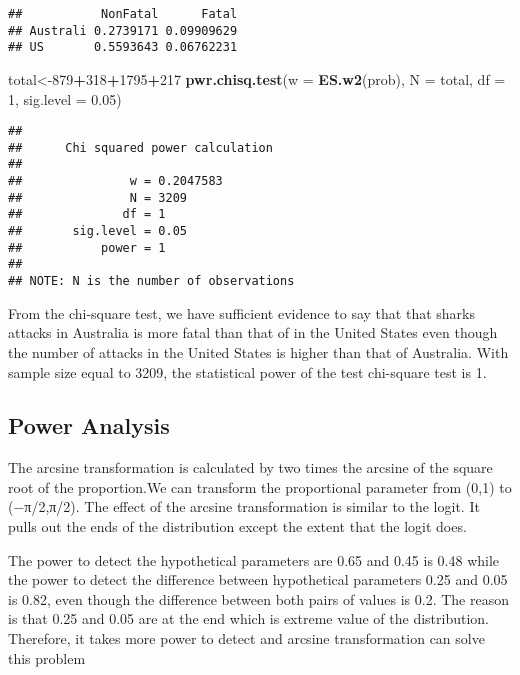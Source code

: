 \documentclass[]{article}
\newenvironment{Shaded}{\begin{snugshade}}{\end{snugshade}}
\newcommand{\KeywordTok}[1]{\textcolor[rgb]{0.13,0.29,0.53}{\textbf{#1}}}
\newcommand{\DataTypeTok}[1]{\textcolor[rgb]{0.13,0.29,0.53}{#1}}
\newcommand{\DecValTok}[1]{\textcolor[rgb]{0.00,0.00,0.81}{#1}}
\newcommand{\FloatTok}[1]{\textcolor[rgb]{0.00,0.00,0.81}{#1}}
\newcommand{\OperatorTok}[1]{\textcolor[rgb]{0.81,0.36,0.00}{\textbf{#1}}}
\newcommand{\NormalTok}[1]{#1}
\begin{document}
\begin{verbatim}
##           NonFatal      Fatal
## Australi 0.2739171 0.09909629
## US       0.5593643 0.06762231
\end{verbatim}

\begin{Shaded}
\begin{Highlighting}[]
\NormalTok{total<-}\DecValTok{879}\OperatorTok{+}\DecValTok{318}\OperatorTok{+}\DecValTok{1795}\OperatorTok{+}\DecValTok{217}
\KeywordTok{pwr.chisq.test}\NormalTok{(}\DataTypeTok{w =} \KeywordTok{ES.w2}\NormalTok{(prob), }\DataTypeTok{N =}\NormalTok{ total, }\DataTypeTok{df =} \DecValTok{1}\NormalTok{, }\DataTypeTok{sig.level =} \FloatTok{0.05}\NormalTok{)}
\end{Highlighting}
\end{Shaded}

\begin{verbatim}
## 
##      Chi squared power calculation 
## 
##               w = 0.2047583
##               N = 3209
##              df = 1
##       sig.level = 0.05
##           power = 1
## 
## NOTE: N is the number of observations
\end{verbatim}

From the chi-square test, we have sufficient evidence to say that that
sharks attacks in Australia is more fatal than that of in the United
States even though the number of attacks in the United States is higher
than that of Australia. With sample size equal to 3209, the statistical
power of the test chi-square test is 1.

\subsection{Power Analysis}\label{power-analysis}

The arcsine transformation is calculated by two times the arcsine of the
square root of the proportion.We can transform the proportional
parameter from (0,1) to (−π/2,π/2). The effect of the arcsine
transformation is similar to the logit. It pulls out the ends of the
distribution except the extent that the logit does.

The power to detect the hypothetical parameters are 0.65 and 0.45 is
0.48 while the power to detect the difference between hypothetical
parameters 0.25 and 0.05 is 0.82, even though the difference between
both pairs of values is 0.2. The reason is that 0.25 and 0.05 are at the
end which is extreme value of the distribution. Therefore, it takes more
power to detect and arcsine transformation can solve this problem
\end{document}
